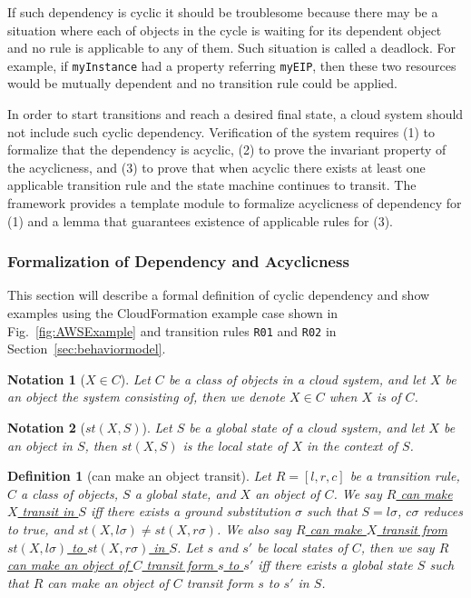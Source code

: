 \documentclass[12pt]{report}
\newtheorem{notation}{Notation}
\newtheorem{definition}{Definition}
\newcommand{\ul}{\underline}
\begin{document}
If such dependency is cyclic it should be troublesome because there
may be a situation where each of objects in the cycle is waiting for
its dependent object and no rule is applicable to any of them. Such
situation is called a deadlock.  For example, if {\tt myInstance} had
a property referring {\tt myEIP}, then these two resources would be
mutually dependent and no transition rule could be applied.

In order to start transitions and reach a desired final state, a cloud
system should not include such cyclic dependency. Verification of the
system requires (1) to formalize that the dependency is acyclic, (2)
to prove the invariant property of the acyclicness, and (3) to prove that
when acyclic there exists at least one applicable transition rule and the
state machine continues to transit. The framework provides a template module
to formalize acyclicness of dependency for (1) and a lemma that
guarantees existence of applicable rules for (3).

\subsubsection{Formalization of Dependency and Acyclicness}
This section will describe a formal definition of cyclic dependency
and show examples using the CloudFormation example case shown in
Fig.~\ref{fig:AWSExample} and transition rules {\tt R01} and {\tt R02}
in Section~\ref{sec:behaviormodel}.

\begin{notation}[$X \in C$]
Let $C$ be a class of objects in a cloud system, and let $X$ be an object
the system consisting of, then we denote \ul{$X \in C$} when $X$ is of
$C$.
\end{notation}

\begin{notation}[$st(X,S)$]
Let $S$ be a global state of a cloud system, and let $X$ be an object in
$S$, then \ul{$st(X,S)$} is the local state of $X$ in the context of
$S$.
\end{notation}

\begin{definition}[can make an object transit]
Let $R = [l,r,c]$ be a transition rule, $C$ a class of objects, $S$
a global state, and $X$ an object of $C$. We say \ul{$R$ can
  make $X$ transit in $S$} iff there exists a ground substitution
$\sigma$ such that $S = l\sigma$, $c\sigma$ reduces to true, and
$st(X,l\sigma) \ne st(X,r\sigma)$. We also say \ul{$R$ can make $X$
  transit from $st(X,l\sigma)$ to $st(X,r\sigma)$ in $S$}.  Let $s$
and $s'$ be local states of $C$, then we say \ul{$R$ can make an object
  of $C$ transit form $s$ to $s'$} iff there exists a global state $S$
such that $R$ can make an object of $C$ transit form $s$ to $s'$ in $S$.
\end{definition}
\end{document}
